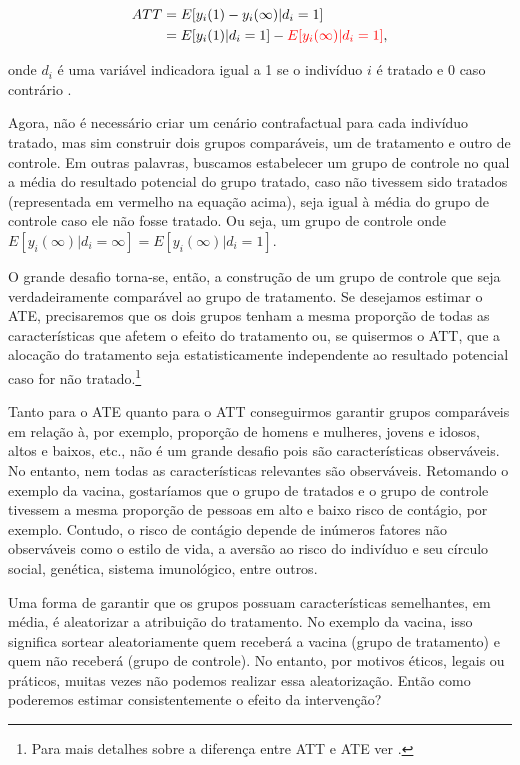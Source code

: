 \documentclass[portugues]{article}
\begin{document}
\[
\begin{split}
    ATT & = E[y_{i}(1) - y_{i}(\infty) | d_i = 1] \\
        & =  E[y_{i}(1) | d_i = 1] - \textcolor{red}{E[y_{i}(\infty) | d_i = 1]},
\end{split}
\] 
         
onde $d_i$ é uma variável indicadora igual a 1 se o indivíduo $i$ é tratado e 0 caso contrário \citep{angrist2009mostly}.

Agora, não é necessário criar um cenário contrafactual para cada indivíduo tratado, mas sim construir dois grupos comparáveis, um de tratamento e outro de controle. Em outras palavras, buscamos estabelecer um grupo de controle no qual a média do resultado potencial do grupo tratado, caso não tivessem sido tratados (representada em vermelho na equação acima), seja igual à média do grupo de controle caso ele não fosse tratado. Ou seja, um grupo de controle onde $E[y_{i}(\infty) | d_i = \infty] = E[y_{i}(\infty) | d_i = 1]$.

O grande desafio torna-se, então, a construção de um grupo de controle que seja verdadeiramente comparável ao grupo de tratamento. Se desejamos estimar o ATE, precisaremos que os dois grupos tenham a mesma proporção de todas as características que afetem o efeito do tratamento ou, se quisermos o ATT, que a alocação do tratamento seja estatisticamente independente ao resultado potencial caso for não tratado.\footnote{Para mais detalhes sobre a diferença entre ATT e ATE ver \cite{macurdy2011flexible}.}

Tanto para o ATE quanto para o ATT conseguirmos garantir 
grupos comparáveis em relação à, por exemplo, proporção de homens e mulheres, jovens e idosos, altos e baixos, etc., não é um grande desafio pois são características observáveis. No entanto, nem todas as características relevantes são observáveis. Retomando o exemplo da vacina, gostaríamos que o grupo de tratados e o grupo de controle tivessem a mesma proporção de pessoas em alto e baixo risco de contágio, por exemplo. Contudo, o risco de contágio depende de inúmeros fatores não observáveis como o estilo de vida, a aversão ao risco do indivíduo e seu círculo social, genética, sistema imunológico, entre outros.

Uma forma de garantir que os grupos possuam características semelhantes, em média, é aleatorizar a atribuição do tratamento. No exemplo da vacina, isso significa sortear aleatoriamente quem receberá a vacina (grupo de tratamento) e quem não receberá (grupo de controle). No entanto, por motivos éticos, legais ou práticos, muitas vezes não podemos realizar essa aleatorização. Então como poderemos estimar consistentemente o efeito da intervenção?
\end{document}
